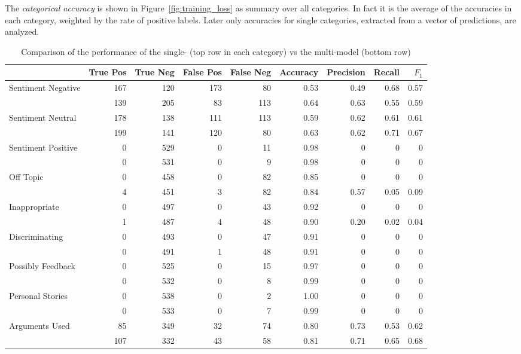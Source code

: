 \documentclass[11pt,a4paper]{article}
\begin{document}
The \textit{categorical accuracy} is shown in Figure~\ref{fig:training_loss} as summary over all categories. In fact it is the average of the accuracies in each category, weighted by the rate of positive labels. Later only accuracies for single categories, extracted from a vector of predictions, are analyzed.


\begin{table}
	\centering\scriptsize
	\begin{tabular}{l r r r r r r r r}
		& True Pos & True Neg & False Pos & False Neg & Accuracy & Precision & Recall & $F_1$ \\
		\hline
		Sentiment Negative & 167 & 120 & 173 & 80 & 0.53 & 0.49 & 0.68 & 0.57 \\
		& 139 & 205 & 83 & 113 & 0.64 & 0.63 & 0.55 & 0.59 \\
		\hline
		Sentiment Neutral & 178 & 138 & 111 & 113 & 0.59 & 0.62 & 0.61 & 0.61 \\
		& 199 & 141 & 120 & 80 & 0.63 & 0.62 & 0.71 & 0.67 \\
		\hline
		Sentiment Positive & 0 & 529 & 0 & 11 & 0.98 & 0 & 0 & 0 \\
		& 0 & 531 & 0 & 9 & 0.98 & 0 & 0 & 0 \\
		\hline
		Off Topic & 0 & 458 & 0 & 82 & 0.85 & 0 & 0 & 0 \\
		& 4 & 451 & 3 & 82 & 0.84 & 0.57 & 0.05 & 0.09 \\
		\hline
		Inappropriate & 0 & 497 & 0 & 43 & 0.92 & 0 & 0 & 0 \\
		& 1 & 487 & 4 & 48 & 0.90 & 0.20 & 0.02 & 0.04 \\
		\hline
		Discriminating & 0 & 493 & 0 & 47 & 0.91 & 0 & 0 & 0 \\
		& 0 & 491 & 1 & 48 & 0.91 & 0 & 0 & 0 \\
		\hline
		Possibly Feedback & 0 & 525 & 0 & 15 & 0.97 & 0 & 0 & 0 \\
		& 0 & 532 & 0 & 8 & 0.99 & 0 & 0 & 0 \\
		\hline
		Personal Stories & 0 & 538 & 0 & 2 & 1.00 & 0 & 0 & 0 \\
		& 0 & 533 & 0 & 7 & 0.99 & 0 & 0 & 0 \\
		\hline
		Arguments Used & 85 & 349 & 32 & 74 & 0.80 & 0.73 & 0.53 & 0.62 \\
		& 107 & 332 & 43 & 58 & 0.81 & 0.71 & 0.65 & 0.68 \\
	\end{tabular}
	\caption{Comparison of the performance of the single- (top row in each category) vs the multi-model (bottom row)}
	\label{tab:results}
\end{table}
\end{document}
